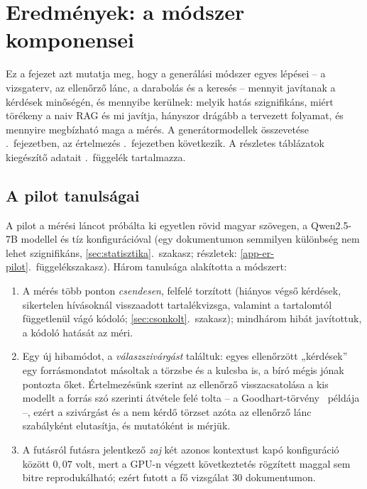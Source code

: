 \chapter{Eredmények: a módszer komponensei}
\label{ch:eredmenyek}

Ez a fejezet azt mutatja meg, hogy a generálási módszer egyes lépései -- a vizsgaterv, az ellenőrző lánc, a
darabolás és a keresés -- mennyit javítanak a kérdések minőségén, és mennyibe kerülnek: melyik hatás
szignifikáns, miért törékeny a naiv RAG és mi javítja, hányszor drágább a tervezett folyamat, és mennyire
megbízható maga a mérés. A generátormodellek összevetése \az{\ref{ch:modellek}}.~fejezetben, az értelmezés
\az{\ref{ch:diszkusszio}}.~fejezetben következik. A részletes táblázatok kiegészítő adatait
\az{\ref{app-eredmeny-reszletek}}.~függelék tartalmazza.

\section{A pilot tanulságai}
\label{sec:pilot}
\label{sec:szivargas}
\label{sec:zaj}

A pilot a mérési láncot próbálta ki egyetlen rövid magyar szövegen, a Qwen2.5-7B modellel és tíz konfigurációval
(egy dokumentumon semmilyen különbség nem lehet szignifikáns, \ref{sec:statisztika}.~szakasz; részletek:
\ref{app-er-pilot}.~függelékszakasz). Három tanulsága alakította a módszert:

\begin{enumerate}[label=(\arabic*),leftmargin=*,itemsep=2pt,topsep=2pt]
\item A mérés több ponton \emph{csendesen}, felfelé torzított (hiányos végső kérdések, sikertelen hívásoknál
visszaadott tartalékvizsga, valamint a tartalomtól függetlenül vágó kódoló; \ref{sec:csonkolt}.~szakasz); mindhárom hibát
javítottuk, a kódoló hatását az  méri.

\item Egy új hibamódot, a \emph{válaszszivárgást} találtuk: egyes ellenőrzött „kérdések” egy
forrásmondatot másoltak a törzsbe és a kulcsba is, a bíró mégis jónak pontozta őket. Értelmezésünk szerint az
ellenőrző visszacsatolása a kis modellt a forrás szó szerinti átvétele felé tolta -- a
Goodhart-törvény~\cite{strathern1997} példája --, ezért a szivárgást és a nem kérdő törzset azóta az ellenőrző
lánc szabályként elutasítja, és mutatóként is mérjük.

\item A futásról futásra jelentkező \emph{zaj} két azonos kontextust kapó konfiguráció között
$0{,}07$ volt, mert a GPU-n végzett következtetés rögzített maggal sem bitre reprodukálható; ezért futott a fő
vizsgálat 30 dokumentumon.
\end{enumerate}

